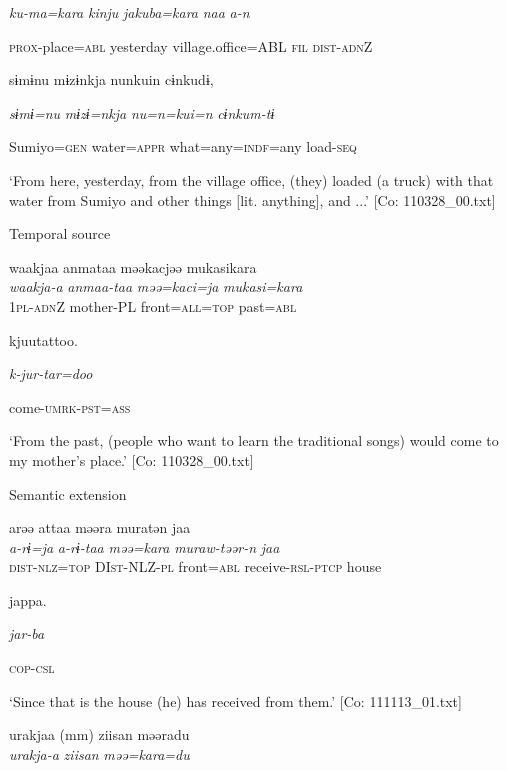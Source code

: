       \textit{ku-ma=kara}  \textit{kinju}  \textit{jakuba=kara}  \textit{naa}  \textit{a-n}

      \textsc{prox}-place=\textsc{abl}  yesterday  village.office=ABL  \textsc{fil}  \textsc{dist}-\textsc{adn}Z

      sɨmɨnu  mɨzɨnkja  nunkuin  cɨnkudɨ,

      \textit{sɨmɨ=nu}  \textit{mɨzɨ=nkja}  \textit{nu=n=kui=n}  \textit{cɨnkum-tɨ}

      Sumiyo=\textsc{gen}  water=\textsc{appr}  what=any=\textsc{indf}=any  load-\textsc{seq}

\glt ‘From here, yesterday, from the village office, (they) loaded (a truck) with that water from Sumiyo and other things [lit. anything], and ...’ [Co: 110328\_00.txt]
\z

  Temporal source

 \ex {\TM}  waakjaa  anmataa  məəkacjəə  mukasikara\\
\gll \textit{waakja-a}  \textit{anmaa-taa}  \textit{məə=kaci=ja}  \textit{mukasi=kara}\\

      1\textsc{pl}-\textsc{adn}Z  mother-PL  front=\textsc{all}=\textsc{top}  past=\textsc{abl}

      kjuutattoo.

      \textit{k-jur-tar=doo}

      come-\textsc{umrk}-\textsc{pst}=\textsc{ass}

\glt ‘From the past, (people who want to learn the traditional songs) would come to my mother’s place.’ [Co: 110328\_00.txt]
\z

  Semantic extension

 \ex {\TM}  arəə  attaa  məəra  muratən  jaa\\
\gll \textit{a-rɨ=ja}  \textit{a-rɨ-taa}  \textit{məə=kara}  \textit{muraw-təər-n}  \textit{jaa}\\

      \textsc{dist}-\textsc{nlz}=\textsc{top}  DI\textsc{st}-NLZ-\textsc{pl}  front=\textsc{abl}  receive-\textsc{rsl}-\textsc{ptcp}  house

      jappa.

      \textit{jar-ba}

      \textsc{cop}-\textsc{csl}

\glt ‘Since that is the house (he) has received from them.’ [Co: 111113\_01.txt]
\z

 \ex {\TM}  urakjaa  (mm)  ziisan  məəradu\\
\gll \textit{urakja-a}    \textit{ziisan}  \textit{məə=kara=du}\\

